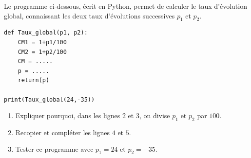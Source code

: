 \begin{exo}{}
	Le programme ci-dessous, écrit en Python, permet de calculer le taux d'évolution global, connaissant les deux taux d'évolutions successives $p_1$ et $p_2$.


	\begin{lstlisting}
def Taux_global(p1, p2):
    CM1 = 1+p1/100
    CM2 = 1+p2/100
    CM = .....
    p = .....
    return(p)

print(Taux_global(24,-35))
		\end{lstlisting}


	\begin{enumerate}
		\item Expliquer pourquoi, dans les lignes $2$ et 3, on divise $p_1$ et $p_2$ par $100$.
		\item Recopier et compléter les lignes $4$ et $5$.
		\item Tester ce programme avec $p_1 = 24$ et $p_2 = -35$.
	\end{enumerate}
\end{exo}
